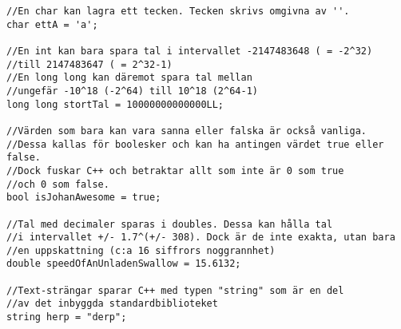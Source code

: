 \begin{lstlisting}
//En char kan lagra ett tecken. Tecken skrivs omgivna av ''.
char ettA = 'a';

//En int kan bara spara tal i intervallet -2147483648 ( = -2^32)
//till 2147483647 ( = 2^32-1)
//En long long kan däremot spara tal mellan 
//ungefär -10^18 (-2^64) till 10^18 (2^64-1)
long long stortTal = 10000000000000LL;

//Värden som bara kan vara sanna eller falska är också vanliga.
//Dessa kallas för boolesker och kan ha antingen värdet true eller false.
//Dock fuskar C++ och betraktar allt som inte är 0 som true
//och 0 som false.
bool isJohanAwesome = true;

//Tal med decimaler sparas i doubles. Dessa kan hålla tal
//i intervallet +/- 1.7^(+/- 308). Dock är de inte exakta, utan bara
//en uppskattning (c:a 16 siffrors noggrannhet)
double speedOfAnUnladenSwallow = 15.6132;

//Text-strängar sparar C++ med typen "string" som är en del
//av det inbyggda standardbiblioteket
string herp = "derp";
\end{lstlisting}
